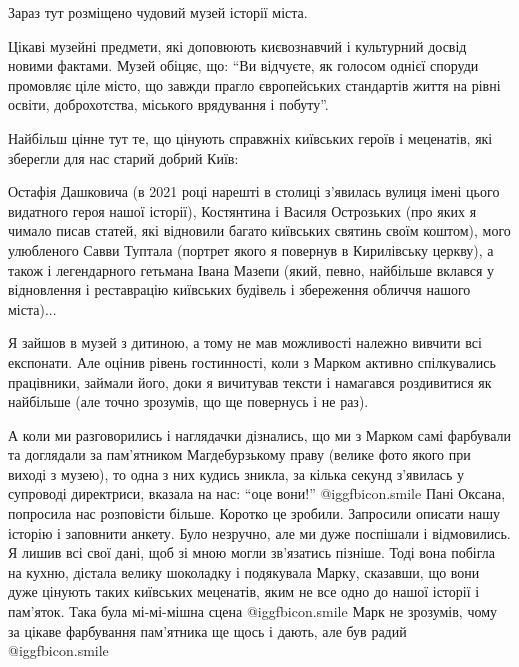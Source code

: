 Зараз тут розміщено чудовий музей історії міста. 


Цікаві музейні предмети, які доповюють києвознавчий і культурний досвід новими
фактами. Музей обіцяє, що: \enquote{Ви відчуєте, як голосом однієї споруди промовляє
ціле місто, що завжди прагло європейських стандартів життя на рівні освіти,
доброхотства, міського врядування і побуту}. 


Найбільш цінне тут те, що цінують справжніх київських героїв і меценатів, які
зберегли для нас старий добрий Київ: 

Остафія Дашковича (в 2021 році нарешті в столиці з’явилась вулиця імені цього
видатного героя нашої історії), Костянтина і Василя Острозьких (про яких я
чимало писав статей, які відновили багато київських святинь своїм коштом), мого
улюбленого Савви Туптала (портрет якого я повернув в Кирилівську церкву), а
також і легендарного гетьмана Івана Мазепи (який, певно, найбільше вклався у
відновлення і реставрацію київських будівель і збереження обличчя нашого
міста)...


Я зайшов в музей з дитиною, а тому не мав можливості належно вивчити всі
експонати. Але оцінив рівень гостинності, коли з Марком активно спілкувались
працівники, займали його, доки я вичитував тексти і намагався роздивитися як
найбільше (але точно зрозумів, що ще повернусь і не раз). 

А коли ми
разговорились і наглядачки дізнались, що ми з Марком самі фарбували та
доглядали за пам’ятником Магдебурзькому праву (велике фото якого при виході з
музею), то одна з них кудись зникла, за кілька секунд з’явилась у супроводі
директриси, вказала на нас: \enquote{оце вони!}  @igg{fbicon.smile}  Пані Оксана, попросила нас
розповісти більше. Коротко це зробили. Запросили описати нашу історію і
заповнити анкету. Було незручно, але ми дуже поспішали і відмовились. Я лишив
всі свої дані, щоб зі мною могли зв’язатись пізніше. Тоді вона побігла на
кухню, дістала велику шоколадку і подякувала Марку, сказавши, що вони дуже
цінують таких київських меценатів, яким не все одно до нашої історії і
пам’яток. Така була мі-мі-мішна сцена  @igg{fbicon.smile}  Марк не зрозумів, чому за цікаве
фарбування пам’ятника ще щось і дають, але був радий  @igg{fbicon.smile}  

